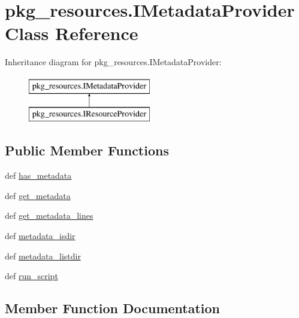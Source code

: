 \hypertarget{classpkg__resources_1_1IMetadataProvider}{}\section{pkg\+\_\+resources.\+I\+Metadata\+Provider Class Reference}
\label{classpkg__resources_1_1IMetadataProvider}
Inheritance diagram for pkg\+\_\+resources.\+I\+Metadata\+Provider\+:\begin{figure}[H]
\begin{center}
\leavevmode
\includegraphics[height=2.000000cm]{classpkg__resources_1_1IMetadataProvider}
\end{center}
\end{figure}
\subsection*{Public Member Functions}
\begin{DoxyCompactItemize}
\item 
def \hyperlink{classpkg__resources_1_1IMetadataProvider_a99abfb81e0dc9bd558335cd454ba3d47}{has\+\_\+metadata}
\item 
def \hyperlink{classpkg__resources_1_1IMetadataProvider_ab800702542e89c91fd1fbea2245e2e21}{get\+\_\+metadata}
\item 
def \hyperlink{classpkg__resources_1_1IMetadataProvider_a700de127597e6a0d6a6d6cde8c4b665e}{get\+\_\+metadata\+\_\+lines}
\item 
def \hyperlink{classpkg__resources_1_1IMetadataProvider_add9c8586e748d90d244315c1320719c2}{metadata\+\_\+isdir}
\item 
def \hyperlink{classpkg__resources_1_1IMetadataProvider_af55eae15cbc79c93a17f64f5f816457e}{metadata\+\_\+listdir}
\item 
def \hyperlink{classpkg__resources_1_1IMetadataProvider_a1f59403b82b4b22897e412688afaa5d2}{run\+\_\+script}
\end{DoxyCompactItemize}


\subsection{Member Function Documentation}
\hypertarget{classpkg__resources_1_1IMetadataProvider_ab800702542e89c91fd1fbea2245e2e21}{}
